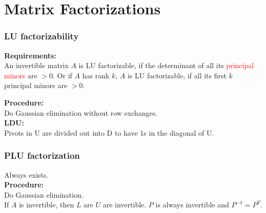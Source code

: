 \section{Matrix Factorizations}

\subsubsection{LU factorizability}
\begin{center}
\end{center}
\textbf{Requirements:} \\
An invertible matrix $A$ is LU factorizable, if the determinant of all its \textcolor{red}{principal minors} are $> 0$.
Or if $A$ has rank $k$, $A$ is LU factorizable, if all its first $k$ principal minors are $> 0$.

\textbf{Procedure:}\\
Do Gaussian elimination without row exchanges.\\
\textbf{LDU:}\\
Pivots in U are divided out into D to have 1s in the diagonal of U.\\

\subsubsection{PLU factorization}
\begin{center}
\end{center}
Always exists.\\
\textbf{Procedure:}\\
Do Gaussian elimination.\\
If $A$ is invertible, then $L$ are $U$ are invertible. $P$ is always invertible and $P^{-1} = P^T$.\\
